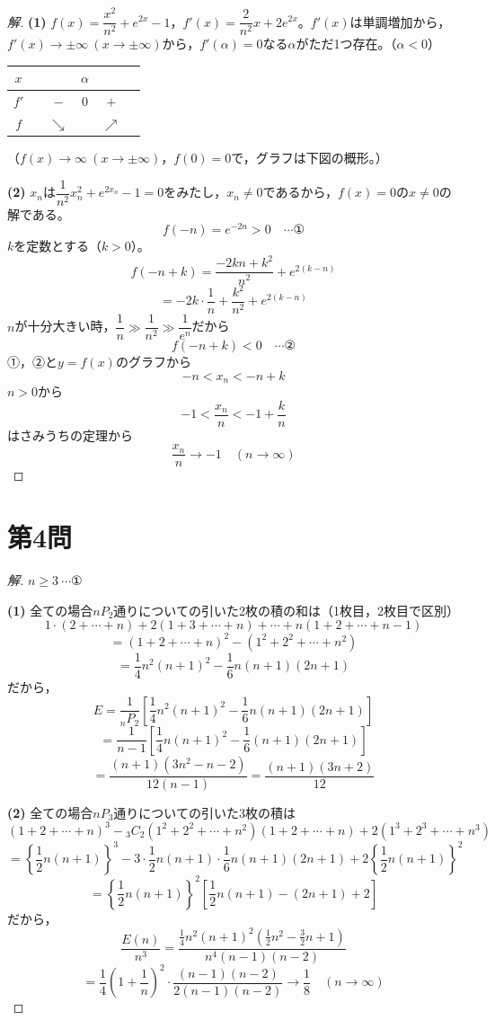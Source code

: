 \documentclass[../main.tex]{subfiles}
\begin{document}
\begin{proof}[解]
  \textbf{(1)} $f(x)=\dfrac{x^2}{n^2}+e^{2x}-1$，$f'(x)=\dfrac{2}{n^2}x+2e^{2x}$。$f'(x)$は単調増加から，$f'(x)\to\pm\infty\ (x\to\pm\infty)$から，$f'(\alpha)=0$なる$\alpha$がただ1つ存在。（$\alpha<0$）
  \begin{center}
    \begin{tabular}{c|ccccc}
      $x$ & & & $\alpha$ & & \\
      \hline
      $f'$ & & $-$ & $0$ & $+$ & \\
      \hline
      $f$ & & $\searrow$ & & $\nearrow$ &
    \end{tabular}
  \end{center}
  （$f(x)\to\infty\ (x\to\pm\infty)$，$f(0)=0$で，グラフは下図の概形。）

  \textbf{(2)} $x_n$は$\dfrac{1}{n^2}x_n^2+e^{2x_n}-1=0$をみたし，$x_n\ne0$であるから，$f(x)=0$の$x\ne0$の解である。
  \[
    f(-n)=e^{-2n}>0 \quad\cdots\text{①}
  \]
  $k$を定数とする（$k>0$）。
  \[
    f(-n+k)=\frac{-2kn+k^2}{n^2}+e^{2(k-n)}
  \]
  \[
    =-2k\cdot\frac1n+\frac{k^2}{n^2}+e^{2(k-n)}
  \]
  $n$が十分大きい時，$\dfrac1n\gg\dfrac1{n^2}\gg\dfrac1{e^n}$だから
  \[
    f(-n+k)<0 \quad\cdots\text{②}
  \]
  ①，②と$y=f(x)$のグラフから
  \[
    -n<x_n<-n+k
  \]
  $n>0$から
  \[
    -1<\frac{x_n}{n}<-1+\frac{k}{n}
  \]
  はさみうちの定理から
  \[
    \frac{x_n}{n}\longrightarrow-1 \quad(n\to\infty)
  \]
\end{proof}

\newpage

\section*{第4問}

\begin{proof}[解]
  $n\ge3\ \cdots$①

  \textbf{(1)} 全ての場合$nP_2$通りについての引いた2枚の積の和は（1枚目，2枚目で区別）
  \[
    1\cdot(2+\cdots+n)+2(1+3+\cdots+n)+\cdots+n(1+2+\cdots+n-1)
  \]
  \[
    =(1+2+\cdots+n)^2-(1^2+2^2+\cdots+n^2)
  \]
  \[
    =\frac14n^2(n+1)^2-\frac16n(n+1)(2n+1)
  \]
  だから，
  \[
    E=\frac{1}{{}_nP_2}\left[\frac14n^2(n+1)^2-\frac16n(n+1)(2n+1)\right]
  \]
  \[
    =\frac{1}{n-1}\left[\frac14n(n+1)^2-\frac16(n+1)(2n+1)\right]
  \]
  \[
    =\frac{(n+1)(3n^2-n-2)}{12(n-1)}=\frac{(n+1)(3n+2)}{12}
  \]

  \textbf{(2)} 全ての場合$nP_3$通りについての引いた3枚の積は
  \[
    (1+2+\cdots+n)^3-{}_3C_2(1^2+2^2+\cdots+n^2)(1+2+\cdots+n)+2(1^3+2^3+\cdots+n^3)
  \]
  \[
    =\left\{\frac12n(n+1)\right\}^3-3\cdot\frac12n(n+1)\cdot\frac16n(n+1)(2n+1)+2\left\{\frac12n(n+1)\right\}^2
  \]
  \[
    =\left\{\frac12n(n+1)\right\}^2\left[\frac12n(n+1)-(2n+1)+2\right]
  \]
  だから，
  \[
    \frac{E(n)}{n^3}=\frac{\frac14n^2(n+1)^2\left(\frac12n^2-\frac32n+1\right)}{n^4(n-1)(n-2)}
  \]
  \[
    =\frac14\left(1+\frac1n\right)^2\cdot\frac{(n-1)(n-2)}{2(n-1)(n-2)}\longrightarrow\frac18 \quad(n\to\infty)
  \]
\end{proof}
\end{document}

